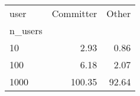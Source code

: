 \begin{tabular}{lrr}
\toprule
user & Committer & Other \\
n_users &  &  \\
\midrule
10 & 2.93 & 0.86 \\
100 & 6.18 & 2.07 \\
1000 & 100.35 & 92.64 \\
\bottomrule
\end{tabular}
